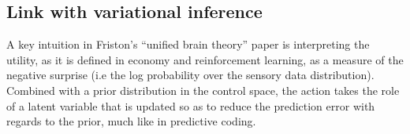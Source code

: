 \documentclass[runningheads]{llncs}
\begin{document}






\subsection{Link with variational inference}
A key intuition in Friston's  ``unified brain theory'' paper \cite{friston2010free} is interpreting the utility, as it is defined in economy and reinforcement learning, as a measure of the negative surprise (i.e the log probability over the sensory data distribution). Combined with a prior distribution in the control space, the action takes the role of a latent variable that is updated so as to reduce the prediction error with regards to the prior, much like in predictive coding. 
\end{document}
